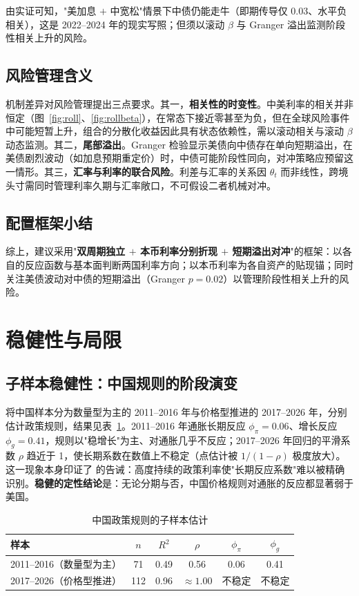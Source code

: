 \documentclass[12pt,a4paper]{ctexart}
\renewcommand{\citet}[1]{\citep{#1}}
\begin{document}
由实证可知，"美加息 $+$ 中宽松"情景下中债仍能走牛（即期传导仅 0.03、水平负相关），这是 2022--2024 年的现实写照；但须以滚动 $\beta$ 与 Granger 溢出监测阶段性相关上升的风险。

\subsection{风险管理含义}
机制差异对风险管理提出三点要求。其一，\textbf{相关性的时变性}。中美利率的相关并非恒定（图~\ref{fig:roll}、\ref{fig:rollbeta}），在常态下接近零甚至为负，但在全球风险事件中可能短暂上升，组合的分散化收益因此具有状态依赖性，需以滚动相关与滚动 $\beta$ 动态监测。其二，\textbf{尾部溢出}。Granger 检验显示美债向中债存在单向短期溢出，在美债剧烈波动（如加息预期重定价）时，中债可能阶段性同向，对冲策略应预留这一情形。其三，\textbf{汇率与利率的联合风险}。利差与汇率的关系因 $\theta_t$ 而非线性，跨境头寸需同时管理利率久期与汇率敞口，不可假设二者机械对冲。

\subsection{配置框架小结}
综上，建议采用"\textbf{双周期独立 $+$ 本币利率分别折现 $+$ 短期溢出对冲}"的框架：以各自的反应函数与基本面判断两国利率方向；以本币利率为各自资产的贴现锚；同时关注美债波动对中债的短期溢出（Granger $p=0.02$）以管理阶段性相关上升的风险。

\section{稳健性与局限}

\subsection{子样本稳健性：中国规则的阶段演变}
将中国样本分为数量型为主的 2011--2016 年与价格型推进的 2017--2026 年，分别估计政策规则，结果见表~\ref{tab:subsample}。2011--2016 年通胀长期反应 $\phi_\pi=0.06$、增长反应 $\phi_g=0.41$，规则以"稳增长"为主、对通胀几乎不反应；2017--2026 年回归的平滑系数 $\rho$ 趋近于 1，使长期系数在数值上不稳定（点估计被 $1/(1-\rho)$ 极度放大）。这一现象本身印证了 \citet{rudebusch2002} 的告诫：高度持续的政策利率使"长期反应系数"难以被精确识别。\textbf{稳健的定性结论}是：无论分期与否，中国价格规则对通胀的反应都显著弱于美国。

\begin{table}[H]
\centering
\caption{中国政策规则的子样本估计}
\label{tab:subsample}
\small
\begin{tabular}{l ccccc}
\toprule
样本 & $n$ & $R^2$ & $\rho$ & $\phi_\pi$ & $\phi_g$ \\
\midrule
2011--2016（数量型为主） & 71 & 0.49 & 0.56 & 0.06 & 0.41 \\
2017--2026（价格型推进） & 112 & 0.96 & $\approx 1.00$ & 不稳定 & 不稳定 \\
\bottomrule
\end{tabular}
\end{table}
\end{document}
